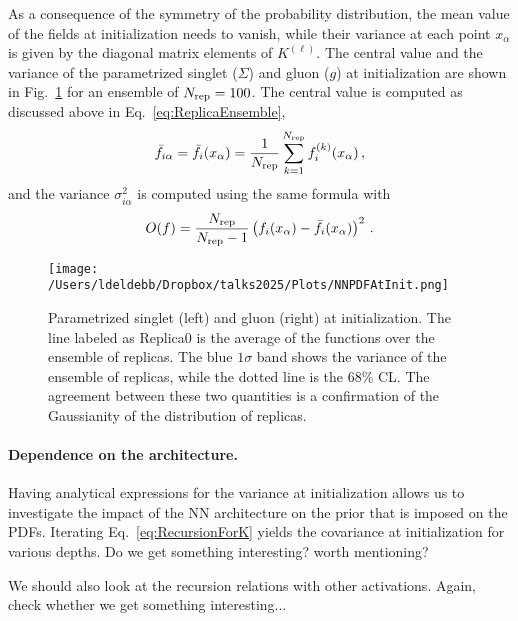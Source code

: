 \documentclass[11pt]{article}
\begin{document}
As a consequence of the symmetry of the probability distribution, the mean value of the fields at 
initialization needs to vanish, while their variance at each point $x_\alpha$ is given by the 
diagonal matrix elements of $K^{(\ell)}$. The central value and the variance of the 
parametrized singlet ($\Sigma$) and gluon ($g$) at initialization are shown in 
Fig.~\ref{fig:SingletGluonInit} for an ensemble of $N_{\rm rep}=100$. The central value is computed as 
discussed above in Eq.~\eqref{eq:ReplicaEnsemble}, 
\begin{align}
    \label{eq:MeanValAtInit}
    \bar{f}_{i\alpha} = \bar{f}_{i}(x_\alpha) = \frac{1}{N_{\rm rep}} \sum_{k=1}^{N_{\rm rep}} f^{(k)}_i(x_\alpha)\, ,
\end{align}
and the variance $\sigma^2_{i\alpha}$ is computed using the same formula with 
\begin{align}
    \label{eq:VarAtInit}
    O(f) = \frac{N_{\rm rep}}{N_{\rm rep}-1} \left(f_i(x_\alpha) - \bar{f}_{i}(x_\alpha)\right)^2\, .
\end{align}

\begin{figure}[!ht]
    \begin{center}
        \texttt{[image: /Users/ldeldebb/Dropbox/talks2025/Plots/NNPDFAtInit.png]}
    \end{center}
    \caption{Parametrized singlet (left) and gluon (right) at initialization. The line labeled 
    as Replica0 is the average of the functions over the ensemble of replicas. The blue $1\sigma$ band 
    shows the variance of the ensemble of replicas, while the dotted line is the 68\% CL. 
    The agreement between these two quantities is a confirmation of the Gaussianity of the 
    distribution of replicas. 
    \label{fig:SingletGluonInit}
    }
\end{figure}

\paragraph{Dependence on the architecture.}
Having analytical expressions for the variance at initialization allows us to investigate the 
impact of the NN architecture on the prior that is imposed on the PDFs. Iterating 
Eq.~\eqref{eq:RecursionForK} yields the covariance at initialization for various depths. 
Do we get something interesting? worth mentioning? 

We should also look at the recursion relations with other activations. Again, check whether we
get something interesting... 
\end{document}
